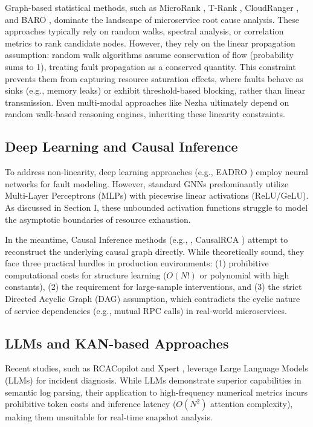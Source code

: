 \documentclass[conference]{IEEEtran}
\begin{document}
Graph-based statistical methods, such as MicroRank \cite{microrank2021}, T-Rank \cite{trank2021}, CloudRanger \cite{cloudranger2018}, and BARO \cite{baro2023}, dominate the landscape of microservice root cause analysis. These approaches typically rely on random walks, spectral analysis, or correlation metrics to rank candidate nodes. However, they rely on the linear propagation assumption: random walk algorithms assume conservation of flow (probability sums to 1), treating fault propagation as a conserved quantity. This constraint prevents them from capturing resource saturation effects, where faults behave as sinks (e.g., memory leaks) or exhibit threshold-based blocking, rather than linear transmission. Even multi-modal approaches like Nezha \cite{nezha2023} ultimately depend on random walk-based reasoning engines, inheriting these linearity constraints.

\subsection{Deep Learning and Causal Inference}

To address non-linearity, deep learning approaches (e.g., EADRO \cite{eadro2023}) employ neural networks for fault modeling. However, standard GNNs predominantly utilize Multi-Layer Perceptrons (MLPs) with piecewise linear activations (ReLU/GeLU). As discussed in Section I, these unbounded activation functions struggle to model the asymptotic boundaries of resource exhaustion.

In the meantime, Causal Inference methods (e.g., \cite{gnn_rca2023}, CausalRCA \cite{causalrca2023}) attempt to reconstruct the underlying causal graph directly. While theoretically sound, they face three practical hurdles in production environments: (1) prohibitive computational costs for structure learning ($O(N!)$ or polynomial with high constants), (2) the requirement for large-sample interventions, and (3) the strict Directed Acyclic Graph (DAG) assumption, which contradicts the cyclic nature of service dependencies (e.g., mutual RPC calls) in real-world microservices.

\subsection{LLMs and KAN-based Approaches}

Recent studies, such as RCACopilot \cite{rcacopilot2024} and Xpert \cite{xpert2024}, leverage Large Language Models (LLMs) for incident diagnosis. While LLMs demonstrate superior capabilities in semantic log parsing, their application to high-frequency numerical metrics incurs prohibitive token costs and inference latency ($O(N^2)$ attention complexity), making them unsuitable for real-time snapshot analysis.
\end{document}
